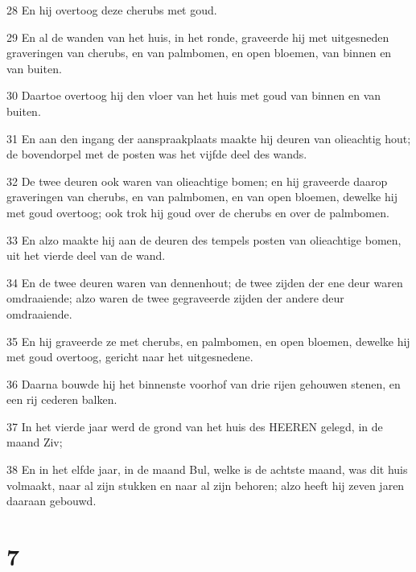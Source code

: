 \par 28 En hij overtoog deze cherubs met goud.
\par 29 En al de wanden van het huis, in het ronde, graveerde hij met uitgesneden graveringen van cherubs, en van palmbomen, en open bloemen, van binnen en van buiten.
\par 30 Daartoe overtoog hij den vloer van het huis met goud van binnen en van buiten.
\par 31 En aan den ingang der aanspraakplaats maakte hij deuren van olieachtig hout; de bovendorpel met de posten was het vijfde deel des wands.
\par 32 De twee deuren ook waren van olieachtige bomen; en hij graveerde daarop graveringen van cherubs, en van palmbomen, en van open bloemen, dewelke hij met goud overtoog; ook trok hij goud over de cherubs en over de palmbomen.
\par 33 En alzo maakte hij aan de deuren des tempels posten van olieachtige bomen, uit het vierde deel van de wand.
\par 34 En de twee deuren waren van dennenhout; de twee zijden der ene deur waren omdraaiende; alzo waren de twee gegraveerde zijden der andere deur omdraaiende.
\par 35 En hij graveerde ze met cherubs, en palmbomen, en open bloemen, dewelke hij met goud overtoog, gericht naar het uitgesnedene.
\par 36 Daarna bouwde hij het binnenste voorhof van drie rijen gehouwen stenen, en een rij cederen balken.
\par 37 In het vierde jaar werd de grond van het huis des HEEREN gelegd, in de maand Ziv;
\par 38 En in het elfde jaar, in de maand Bul, welke is de achtste maand, was dit huis volmaakt, naar al zijn stukken en naar al zijn behoren; alzo heeft hij zeven jaren daaraan gebouwd.

\chapter{7}

